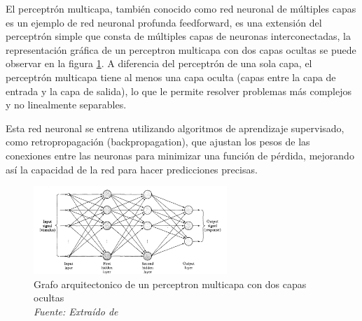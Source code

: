 El perceptrón multicapa, también conocido como red neuronal de múltiples capas es un ejemplo de red neuronal profunda feedforward, es una extensión del perceptrón simple que consta de múltiples capas de neuronas interconectadas, la representación gráfica de un perceptron multicapa con dos capas ocultas se puede observar en la figura \ref{fig:an7}. A diferencia del perceptrón de una sola capa, el perceptrón multicapa tiene al menos una capa oculta (capas entre la capa de entrada y la capa de salida), lo que le permite resolver problemas más complejos y no linealmente separables.

Esta red neuronal se entrena utilizando algoritmos de aprendizaje supervisado, como retropropagación (backpropagation), que ajustan los pesos de las conexiones entre las neuronas para minimizar una función de pérdida, mejorando así la capacidad de la red para hacer predicciones precisas.

\begin{figure}[h!]
	\includegraphics[width=0.65\textwidth]{capitulo2/figuras/an7.png}
	\caption[Grafo arquitectonico de un perceptron multicapa con dos capas ocultas]{Grafo arquitectonico de un perceptron multicapa con dos capas ocultas
		\\\textit{Fuente: Extraído de} \protect\cite[p.281]{haykin1998neural}}
	\label{fig:an7}
\end{figure}

